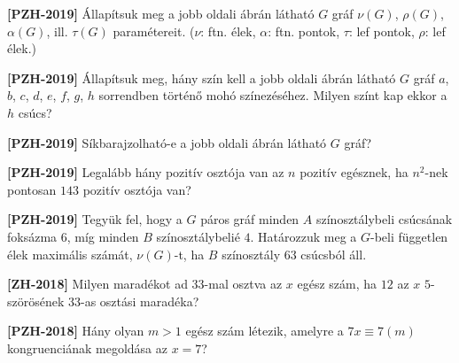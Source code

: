 \documentclass[a4paper, 12pt]{article}
\begin{document}
\begin{enumerate}
        \begin{minipage}{0.6\textwidth}
            \item \textbf{[PZH-2019]} Állapítsuk meg a jobb oldali ábrán látható $G$ gráf $\nu(G)$, $\rho(G)$, $\alpha(G)$, ill. $\tau(G)$ paramétereit. ($\nu$: ftn. élek, $\alpha$: ftn. pontok, $\tau$: lef pontok, $\rho$: lef élek.)
            \item \textbf{[PZH-2019]} Állapítsuk meg, hány szín kell a jobb oldali ábrán látható $G$ gráf $a$, $b$, $c$, $d$, $e$, $f$, $g$, $h$ sorrendben történő mohó színezéséhez. Milyen színt kap ekkor a $h$ csúcs?
            \item \textbf{[PZH-2019]} Síkbarajzolható-e a jobb oldali ábrán látható $G$ gráf?
        \end{minipage}
        \begin{minipage}{0.3\textwidth}
            \centering
            
        \end{minipage}
        \item \textbf{[PZH-2019]} Legalább hány pozitív osztója van az $n$ pozitív egésznek, ha $n^2$-nek pontosan $143$ pozitív osztója van?
        \item \textbf{[PZH-2019]} Tegyük fel, hogy a $G$ páros gráf minden $A$ színosztálybeli csúcsának foksázma $6$, míg minden $B$ színosztálybelié $4$. Határozzuk meg a $G$-beli független élek maximális számát, $\nu(G)$-t, ha $B$ színosztály $63$ csúcsból áll.
        \item \textbf{[ZH-2018]} Milyen maradékot ad $33$-mal osztva az $x$ egész szám, ha $12$ az $x$ $5$-szörösének $33$-as osztási maradéka?
        \item \textbf{[PZH-2018]} Hány olyan $m>1$ egész szám létezik, amelyre a $7x\equiv 7(m)$ kongruenciának megoldása az $x=7$?
    \end{enumerate}
\end{document}
